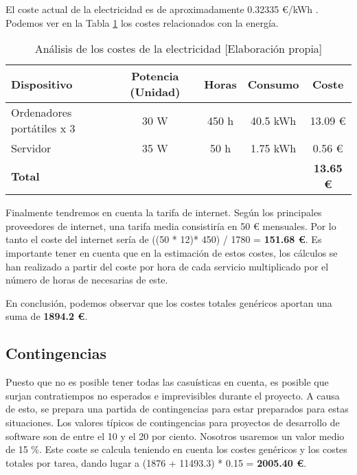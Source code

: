 El coste actual de la electricidad es de aproximadamente 0.32335 €/kWh \cite{precioLuz}. Podemos ver en la Tabla \ref{tab:energia} los costes relacionados con la energía.
\begin{table}[h]
    \begin{center}
        \begin{tabular}{ l  c  c  c  c }
        \textbf{Dispositivo} & \textbf{Potencia (Unidad)} & \textbf{Horas} & \textbf{Consumo} & \textbf{Coste} \\
        \hline
        Ordenadores portátiles x 3 & 30 W & 450 h & 40.5 kWh & 13.09 € \\
        Servidor & 35 W & 50 h & 1.75 kWh & 0.56 € \\
        \hline
        \textbf{Total} & & & & \textbf{13.65 €} \\
        \end{tabular}
        \caption{Análisis de los costes de la electricidad [Elaboración propia]}
        \label{tab:energia}
    \end{center}
\end{table}

Finalmente tendremos en cuenta la tarifa de internet. Según los principales proveedores de internet, una tarifa media consistiría en 50 € mensuales. Por lo tanto el coste del internet sería de ((50 * 12)* 450) / 1780 = \textbf{151.68 €}. Es importante tener en cuenta que en la estimación de estos costes, los cálculos se han realizado a partir del coste por hora de cada servicio multiplicado por el número de horas de necesarias de este.

En conclusión, podemos observar que los costes totales genéricos aportan una suma de \textbf{1894.2 €}.

\subsection{Contingencias}

Puesto que no es posible tener todas las casuísticas en cuenta, es posible que surjan contratiempos no esperados e imprevisibles durante el proyecto. A causa de esto, se prepara una partida de contingencias para estar preparados para estas situaciones. Los valores típicos de contingencias para proyectos de desarrollo de software son de entre el 10 y el 20 por ciento. Nosotros usaremos un valor medio de 15 \%. Este coste se calcula teniendo en cuenta los costes genéricos y los costes totales por tarea, dando lugar a (1876 + 11493.3) * 0.15 = \textbf{2005.40 €}.

